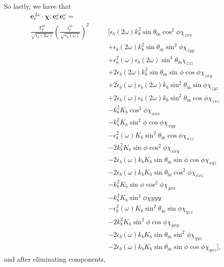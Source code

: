 So lastly, we have that
\begin{equation*}
\begin{split}
\mathbf{e}^{\,2\omega}_{v}\cdot
\boldsymbol{\chi}:\mathbf{e}^{\omega}_{v}\mathbf{e}^{\omega}_{v}
=\qquad\qquad&\\
\frac{T^{v b}_{p}}{\sqrt{\epsilon_{b}(2\omega)}}
\left(\frac{t^{v b}_{p}}{\sqrt{\epsilon_{b}(\omega)}}\right)^{2}
&\big[
    \epsilon_{b}(2\omega)k^{2}_{b}
    \sin\theta_{\mathrm{in}}\cos^{2}\phi\chi_{zxx}\\
&+  \epsilon_{b}(2\omega)k^{2}_{b}
    \sin\theta_{\mathrm{in}}\sin^{2}\phi\chi_{zyy}\\
&+  \epsilon^{2}_{b}(\omega)\epsilon_{b}(2\omega)
    \sin^{3}\theta_{\mathrm{in}}\chi_{zzz}\\
&+ 2\epsilon_{b}(2\omega)k^{2}_{b}\sin\theta_{\mathrm{in}}
    \sin\phi\cos\phi\chi_{zxy}\\
&+ 2\epsilon_{b}(\omega)\epsilon_{b}(2\omega)k_{b}
    \sin^{2}\theta_{\mathrm{in}}\sin\phi\chi_{zyz}\\
&+ 2\epsilon_{b}(\omega)\epsilon_{b}(2\omega)k_{b}
    \sin^{2}\theta_{\mathrm{in}}\cos\phi\chi_{zxz}\\
&-  k^{2}_{b}K_{b}\cos^{3}\phi\chi_{xxx}\\
&-  k^{2}_{b}K_{b}\sin^{2}\phi\cos\phi\chi_{xyy}\\
&-  \epsilon^{2}_{b}(\omega)K_{b}
    \sin^{2}\theta_{\mathrm{in}}\cos\phi\chi_{xzz}\\
&- 2k^{2}_{b}K_{b}\sin\phi\cos^{2}\phi\chi_{xxy}\\
&- 2\epsilon_{b}(\omega)k_{b}K_{b}
    \sin\theta_{\mathrm{in}}\sin\phi\cos\phi\chi_{xyz}\\
&- 2\epsilon_{b}(\omega)k_{b}K_{b}
    \sin\theta_{\mathrm{in}}\cos^{2}\phi\chi_{xxz}\\
&-  k^{2}_{b}K_{b}\sin\phi\cos^{2}\phi\chi_{yxx}\\
&-  k^{2}_{b}K_{b}\sin^{3}\phi\chi{yyy}\\
&-  \epsilon^{2}_{b}(\omega)K_{b}
    \sin^{2}\theta_{\mathrm{in}}\sin\phi\chi_{yzz}\\
&- 2k^{2}_{b}K_{b}\sin^{2}\phi\cos\phi\chi_{yxy}\\
&- 2\epsilon_{b}(\omega)k_{b}K_{b}
    \sin\theta_{\mathrm{in}}\sin^{2}\phi\chi_{yyz}\\
&- 2\epsilon_{b}(\omega)k_{b}K_{b}
    \sin\theta_{\mathrm{in}}\sin\phi\cos\phi\chi_{yxz}
\big],
\end{split}
\end{equation*}
and after eliminating components,

